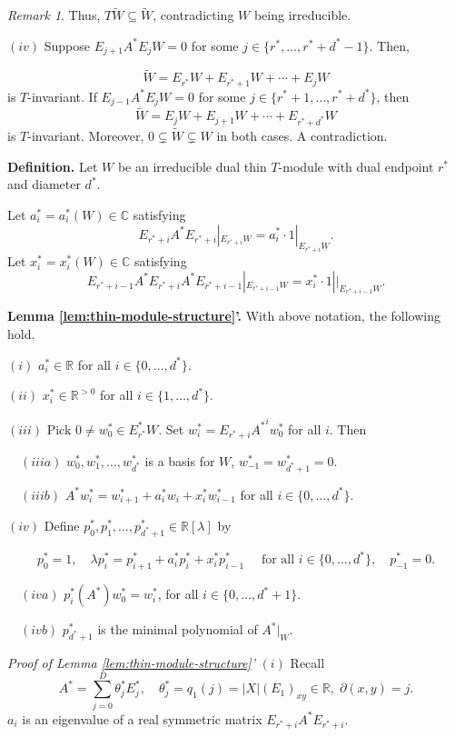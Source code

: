 \documentclass[
]{book}
\theoremstyle{definition}
\theoremstyle{definition}
\theoremstyle{definition}
\theoremstyle{definition}
\theoremstyle{remark}
\newtheorem*{remark}{Remark}
\begin{document}
\begin{remark}
Thus, \(T\widetilde{W} \subseteq \widetilde{W}\), contradicting \(W\) being irreducible.

\((iv)\) Suppose \(E_{j+1}A^*E_jW = 0\) for some \(j\in \{r^*, \ldots, r^*+d^*-1\}\). Then,

\[\widetilde{W} = E_{r^*}W + E_{r^*+1}W + \cdots + E_{j}W\]
is \(T\)-invariant. If \(E_{j-1}A^*E_jW = 0\) for some \(j\in \{r^*+1, \ldots, r^*+d^*\}\), then
\[\widetilde{W} = E_{j}W + E_{j+1}W + \cdots + E_{r^*+d^*}W\]
is \(T\)-invariant. Moreover, \(0 \subsetneq \widetilde{W} \subsetneq W\) in both cases. A contradiction.

\hfill\break

\textbf{Definition.} Let \(W\) be an irreducible dual thin \(T\)-module with dual endpoint \(r^*\) and diameter \(d^*\).

Let \(a^*_i = a^*_i(W)\in\mathbb{C}\) satisfying
\[E_{r^*+i}A^*E_{r^*+i}|_{E_{r^*+i}W} = a^*_i\cdot 1|_{E_{r^*+i}W}.\]
Let \(x^*_i = x^*_i(W)\in \mathbb{C}\) satisfying
\[E_{r^*+i-1}A^*E_{r^*+i}A^*E_{r^*+i-1}|_{E_{r^*+i-1}W} = x^*_i\cdot 1||_{E_{r^*+i-1}W}.\]

\textbf{Lemma \ref{lem:thin-module-structure}'.}
With above notation, the following hold.

\((i)\) \(a^*_i\in \mathbb{R}\) for all \(i\in \{0, \ldots, d^*\}\).

\((ii)\) \(x^*_i\in \mathbb{R}^{>0}\) for all \(i\in \{1, \ldots, d^*\}\).

\((iii)\) Pick \(0\neq w^*_0\in E^*_{r^*}W\). Set \(w^*_i = E_{r^*+i}{A^*}^iw^*_0\) for all \(i\). Then

\(\quad (iiia)\) \(w^*_0, w^*_1, \ldots, w^*_{d^*}\) is a basis for \(W\), \(w^*_{-1} = w^*_{d^*+1} = 0\).

\(\quad (iiib)\) \(A^*w^*_i = w^*_{i+1} + a^*_iw_{i} + x^*_iw^*_{i-1}\) for all \(i\in \{0, \ldots, d^*\}\).

\((iv)\) Define \(p^*_0, p^*_1, \ldots, p^*_{d^*+1}\in \mathbb{R}[\lambda]\) by

\[p^*_0 = 1, \quad \lambda p^*_i = p^*_{i+1} + a^*_i p^*_i + x^*_i p^*_{i-1} \quad \text{ for all } i\in \{0, \ldots, d^*\}, \quad p^*_{-1} = 0.\]

\(\quad (iva)\) \(p^*_i(A^*)w^*_0 = w^*_i\), for all \(i\in \{0, \ldots, d^*+1\}\).

\(\quad (ivb)\) \(p^*_{d^*+1}\) is the minimal polynomial of \(A^*|_W\).

\emph{Proof of Lemma \ref{lem:thin-module-structure}'}
\textbar{} \((i)\) Recall
\[A^* = \sum_{j=0}^D\theta^*_jE^*_j, \quad \theta^*_j = q_1(j) = |X|(E_1)_{xy}\in \mathbb{R}, \; \partial(x,y)=j.\]
\(a_i\) is an eigenvalue of a real symmetric matrix \(E_{r^*+i}A^*E_{r^*+i}\).


\end{remark}
\end{document}
